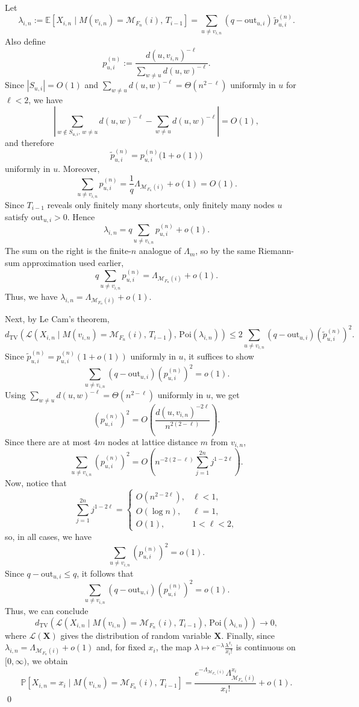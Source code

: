 \documentclass[10pt]{amsart}
\begin{document}
Let
\[
\lambda_{i,n}:=\mathbb E\!\left[X_{i,n}\mid M(v_{i,n})=\mathcal M_{F_n}(i),\,T_{i-1}\right]
=\sum_{u\neq v_{i,n}}(q-\mathrm{out}_{u,i})\,\tilde p_{u,i}^{(n)}.
\]
Also define
\[
p_{u,i}^{(n)}:=\frac{d(u,v_{i,n})^{-\ell}}{\sum_{w\neq u} d(u,w)^{-\ell}}.
\]
Since \(|S_{u,i}|=O(1)\) and \(\sum_{w\neq u} d(u,w)^{-\ell}=\Theta(n^{2-\ell})\) uniformly in \(u\) for \(\ell<2\), we have
\[
\left|
\sum_{w\notin S_{u,i},\,w\neq u} d(u,w)^{-\ell}
-
\sum_{w\neq u} d(u,w)^{-\ell}
\right|=O(1),
\]
and therefore
\[
\tilde p_{u,i}^{(n)}=p_{u,i}^{(n)}\bigl(1+o(1)\bigr)
\]
uniformly in $u$. Moreover,
\[
\sum_{u\neq v_{i,n}} p_{u,i}^{(n)}
=
\frac{1}{q}\Lambda_{\mathcal M_{F_n}(i)}+o(1)=O(1).
\]
Since \(T_{i-1}\) reveals only finitely many shortcuts, only finitely many nodes \(u\) satisfy \(\mathrm{out}_{u,i}>0\). Hence
\[
\lambda_{i,n}
=
q\sum_{u\neq v_{i,n}} p_{u,i}^{(n)}+o(1).
\]
The sum on the right is the finite-\(n\) analogue of \(\Lambda_m\), so by the same Riemann-sum approximation used earlier,
\[
q\sum_{u\neq v_{i,n}} p_{u,i}^{(n)}
=
\Lambda_{\mathcal M_{F_n}(i)}+o(1).
\]
Thus, we have
\(
\lambda_{i,n}=\Lambda_{\mathcal M_{F_n}(i)}+o(1).
\)

Next, by Le Cam’s theorem,
\[
d_{\mathrm{TV}}\!\left(\mathcal L(X_{i,n}\mid M(v_{i,n})=\mathcal M_{F_n}(i),\,T_{i-1}),\,\mathrm{Poi}(\lambda_{i,n})\right)
\le
2\sum_{u\neq v_{i,n}}(q-\mathrm{out}_{u,i})(\tilde p_{u,i}^{(n)})^2.
\]
Since \(\tilde p_{u,i}^{(n)}=p_{u,i}^{(n)}(1+o(1))\) uniformly in \(u\), it suffices to show
\[
\sum_{u\neq v_{i,n}}(q-\mathrm{out}_{u,i})(p_{u,i}^{(n)})^2=o(1).
\]
Using \(\sum_{w\neq u} d(u,w)^{-\ell}=\Theta(n^{2-\ell})\) uniformly in \(u\), we get
\[
(p_{u,i}^{(n)})^2
=
O\!\left(\frac{d(u,v_{i,n})^{-2\ell}}{n^{2(2-\ell)}}\right).
\]
Since there are at most \(4m\) nodes at lattice distance \(m\) from \(v_{i,n}\),
\[
\sum_{u\neq v_{i,n}}(p_{u,i}^{(n)})^2
=
O\!\left(n^{-2(2-\ell)}\sum_{j=1}^{2n} j^{1-2\ell}\right).
\]
Now, notice that
\[
\sum_{j=1}^{2n} j^{1-2\ell}
=
\begin{cases}
O(n^{2-2\ell}),&\ell<1,\\
O(\log n),&\ell=1,\\
O(1),&1<\ell<2,
\end{cases}
\]
so, in all cases, we have
\[
\sum_{u\neq v_{i,n}}(p_{u,i}^{(n)})^2=o(1).
\]
Since \(q-\mathrm{out}_{u,i}\le q\), it follows that
\[
\sum_{u\neq v_{i,n}}(q-\mathrm{out}_{u,i})(p_{u,i}^{(n)})^2=o(1).
\]
Thus, we can conclude
\[
d_{\mathrm{TV}}\!\left(\mathcal L(X_{i,n}\mid M(v_{i,n})=\mathcal M_{F_n}(i),\,T_{i-1}),\,\mathrm{Poi}(\lambda_{i,n})\right)\to 0,
\]
where \(\mathcal L (\mathbf X )\) gives the distribution of random variable \(\mathbf X\).
Finally, since \(\lambda_{i,n}=\Lambda_{\mathcal M_{F_n}(i)}+o(1)\) and, for fixed \(x_i\), the map
\(
\lambda\mapsto e^{-\lambda}\frac{\lambda^{x_i}}{x_i!}
\)
is continuous on \([0,\infty)\), we obtain
\[
\mathbb P\!\left[X_{i,n}=x_i\mid M(v_{i,n})=\mathcal M_{F_n}(i),\,T_{i-1}\right]
=
\frac{e^{-\Lambda_{\mathcal M_{F_n}(i)}}\Lambda_{\mathcal M_{F_n}(i)}^{x_i}}{x_i!}+o(1).
\]
\qed
\end{document}
